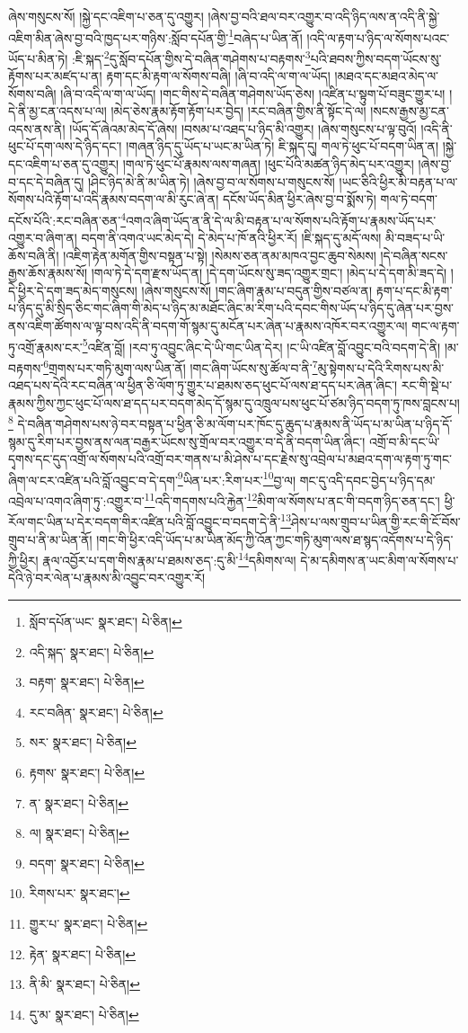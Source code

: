 ཞེས་གསུངས་སོ། །སྐྱེ་དང་འཇིག་པ་ཅན་དུ་འགྱུར། །ཞེས་བྱ་བའི་ཐལ་བར་འགྱུར་བ་འདི་ཉིད་ལས་ན་འདི་ནི་སྐྱེ་འཇིག་མིན་ཞེས་བྱ་བའི་ཁྱད་པར་གཉིས་:སློབ་དཔོན་གྱི་\footnote{སློབ་དཔོན་ཡང་  སྣར་ཐང་།  པེ་ཅིན། }བཞེད་པ་ཡིན་ནོ། །འདི་ལ་རྟག་པ་ཉིད་ལ་སོགས་པའང་ཡོད་པ་མིན་ཏེ། :ཇི་སྐད་\footnote{འདི་སྐད་  སྣར་ཐང་།  པེ་ཅིན། }དུ་སློབ་དཔོན་གྱིས་དེ་བཞིན་གཤེགས་པ་བརྟགས་\footnote{བརྟག་  སྣར་ཐང་།  པེ་ཅིན། }པའི་ཐབས་ཀྱིས་བདག་ཡོངས་སུ་རྟོགས་པར་མཛད་པ་ན། རྟག་དང་མི་རྟག་ལ་སོགས་བཞི། །ཞི་བ་འདི་ལ་ག་ལ་ཡོད། །མཐའ་དང་མཐའ་མེད་ལ་སོགས་བཞི། །ཞི་བ་འདི་ལ་ག་ལ་ཡོད། །གང་གིས་དེ་བཞིན་གཤེགས་ཡོད་ཅེས། །འཛིན་པ་སྟུག་པོ་བཟུང་གྱུར་པ། །དེ་ནི་མྱ་ངན་འདས་པ་ལ། །མེད་ཅེས་རྣམ་རྟོག་རྟོག་པར་བྱེད། །རང་བཞིན་གྱིས་ནི་སྟོང་དེ་ལ། །སངས་རྒྱས་མྱ་ངན་འདས་ནས་ནི། །ཡོད་དོ་ཞེའམ་མེད་དོ་ཞེས། །བསམ་པ་འཐད་པ་ཉིད་མི་འགྱུར། །ཞེས་གསུངས་པ་ལྟ་བུའོ། །འདི་ནི་ཕུང་པོ་དག་ལས་དེ་ཉིད་དང་། །གཞན་ཉིད་དུ་ཡོད་པ་ཡང་མ་ཡིན་ཏེ། ཇི་སྐད་དུ། གལ་ཏེ་ཕུང་པོ་བདག་ཡིན་ན། །སྐྱེ་དང་འཇིག་པ་ཅན་དུ་འགྱུར། །གལ་ཏེ་ཕུང་པོ་རྣམས་ལས་གཞན། །ཕུང་པོའི་མཚན་ཉིད་མེད་པར་འགྱུར། །ཞེས་བྱ་བ་དང་དེ་བཞིན་དུ། །ཤིང་ཉིད་མེ་ནི་མ་ཡིན་ཏེ། །ཞེས་བྱ་བ་ལ་སོགས་པ་གསུངས་སོ། །ཡང་ཅིའི་ཕྱིར་མི་བརྟན་པ་ལ་སོགས་པའི་རྟོག་པ་འདི་རྣམས་བདག་ལ་མི་རུང་ཞེ་ན། དངོས་ཡོད་མིན་ཕྱིར་ཞེས་བྱ་བ་སྨོས་ཏེ། གལ་ཏེ་བདག་དངོས་པོའི་:རང་བཞིན་ཅན་\footnote{རང་བཞིན་  སྣར་ཐང་།  པེ་ཅིན། }འགའ་ཞིག་ཡོད་ན་ནི་དེ་ལ་མི་བརྟན་པ་ལ་སོགས་པའི་རྟོག་པ་རྣམས་ཡོད་པར་འགྱུར་བ་ཞིག་ན། བདག་ནི་འགའ་ཡང་མེད་དེ། དེ་མེད་པ་ཁོ་ནའི་ཕྱིར་རོ། །ཇི་སྐད་དུ་མདོ་ལས། མི་བཟད་པ་ཡི་ཆོས་བཞི་ནི། །འཇིག་རྟེན་མགོན་གྱིས་བསྟན་པ་སྟེ། །སེམས་ཅན་ནམ་མཁའ་བྱང་ཆུབ་སེམས། །དེ་བཞིན་སངས་རྒྱས་ཆོས་རྣམས་སོ། །གལ་ཏེ་དེ་དག་རྫས་ཡོད་ན། །དེ་དག་ཡོངས་སུ་ཟད་འགྱུར་གྲང་། །མེད་པ་དེ་དག་མི་ཟད་དེ། །དེ་ཕྱིར་དེ་དག་ཟད་མེད་གསུངས། །ཞེས་གསུངས་སོ། །གང་ཞིག་རྣམ་པ་བདུན་གྱིས་བཙལ་ན། རྟག་པ་དང་མི་རྟག་པ་ཉིད་དུ་མི་སྲིད་ཅིང་གང་ཞིག་གི་མེད་པ་ཉིད་མ་མཐོང་ཞིང་མ་རིག་པའི་དབང་གིས་ཡོད་པ་ཉིད་དུ་ཞེན་པར་བྱས་ནས་འཇིག་ཚོགས་ལ་ལྟ་བས་འདི་ནི་བདག་གོ་སྙམ་དུ་མངོན་པར་ཞེན་པ་རྣམས་འཁོར་བར་འགྱུར་ལ། གང་ལ་རྟག་ཏུ་འགྲོ་རྣམས་ངར་\footnote{སར་  སྣར་ཐང་།  པེ་ཅིན། }འཛིན་བློ། །རབ་ཏུ་འབྱུང་ཞིང་དེ་ཡི་གང་ཡིན་དེར། །ང་ཡི་འཛིན་བློ་འབྱུང་བའི་བདག་དེ་ནི། །མ་བརྟགས་\footnote{རྟགས་  སྣར་ཐང་།  པེ་ཅིན། }གྲགས་པར་གཏི་མུག་ལས་ཡིན་ནོ། །གང་ཞིག་ཡོངས་སུ་ཚོལ་བ་ནི་\footnote{ན་  སྣར་ཐང་།  པེ་ཅིན། }མུ་སྟེགས་པ་དེའི་རིགས་པས་མི་འཐད་པས་དེའི་རང་བཞིན་ལ་ཕྱིན་ཅི་ལོག་ཏུ་གྱུར་པ་ཐམས་ཅད་ཕུང་པོ་ལས་ཐ་དད་པར་ཞེན་ཞིང་། རང་གི་སྡེ་པ་རྣམས་ཀྱིས་ཀྱང་ཕུང་པོ་ལས་ཐ་དད་པར་བདག་མེད་དོ་སྙམ་དུ་འཁྲུལ་པས་ཕུང་པོ་ཙམ་ཉིད་བདག་ཏུ་ཁས་བླངས་པ།\footnote{ལ།  སྣར་ཐང་།  པེ་ཅིན། } དེ་བཞིན་གཤེགས་པས་ཉེ་བར་བསྟན་པ་ཕྱིན་ཅི་མ་ལོག་པར་ཁོང་དུ་ཆུད་པ་རྣམས་ནི་ཡོད་པ་མ་ཡིན་པ་ཉིད་དོ་སྙམ་དུ་རིག་པར་བྱས་ནས་ལན་བརྒྱར་ཡོངས་སུ་གྲོལ་བར་འགྱུར་བ་དེ་ནི་བདག་ཡིན་ཞིང་། འགྲོ་བ་མི་དང་ཡི་དྭགས་དང་དུད་འགྲོ་ལ་སོགས་པའི་འགྲོ་བར་གནས་པ་མི་ཤེས་པ་དང་རྗེས་སུ་འབྲེལ་པ་མཐའ་དག་ལ་རྟག་ཏུ་གང་ཞིག་ལ་ངར་འཛིན་པའི་བློ་འབྱུང་བ་དེ་དག་\footnote{བདག་  སྣར་ཐང་།  པེ་ཅིན། }ཡིན་པར་:རིག་པར་\footnote{རིགས་པར་  སྣར་ཐང་། }བྱ་ལ། གང་དུ་འདི་དབང་བྱེད་པ་ཉིད་དམ་འབྲེལ་པ་འགའ་ཞིག་ཏུ་:འགྱུར་བ་\footnote{གྱུར་པ་  སྣར་ཐང་།  པེ་ཅིན། }འདི་གདགས་པའི་རྐྱེན་\footnote{རྟེན་  སྣར་ཐང་།  པེ་ཅིན། }མིག་ལ་སོགས་པ་ནང་གི་བདག་ཉིད་ཅན་དང་། ཕྱི་རོལ་གང་ཡིན་པ་དེར་བདག་གིར་འཛིན་པའི་བློ་འབྱུང་བ་བདག་དེ་ནི་\footnote{ནི་མི་  སྣར་ཐང་།  པེ་ཅིན། }ཤེས་པ་ལས་གྲུབ་པ་ཡིན་གྱི་རང་གི་ངོ་བོས་གྲུབ་པ་ནི་མ་ཡིན་ནོ། །གང་གི་ཕྱིར་འདི་ཡོད་པ་མ་ཡིན་མོད་ཀྱི་འོན་ཀྱང་གཏི་མུག་ལས་ཐ་སྙད་འདོགས་པ་དེ་ཉིད་ཀྱི་ཕྱིར། རྣལ་འབྱོར་པ་དག་གིས་རྣམ་པ་ཐམས་ཅད་:དུ་མི་\footnote{དུ་མ་  སྣར་ཐང་།  པེ་ཅིན། }དམིགས་ལ། དེ་མ་དམིགས་ན་ཡང་མིག་ལ་སོགས་པ་དེའི་ཉེ་བར་ལེན་པ་རྣམས་མི་འབྱུང་བར་འགྱུར་རོ། 